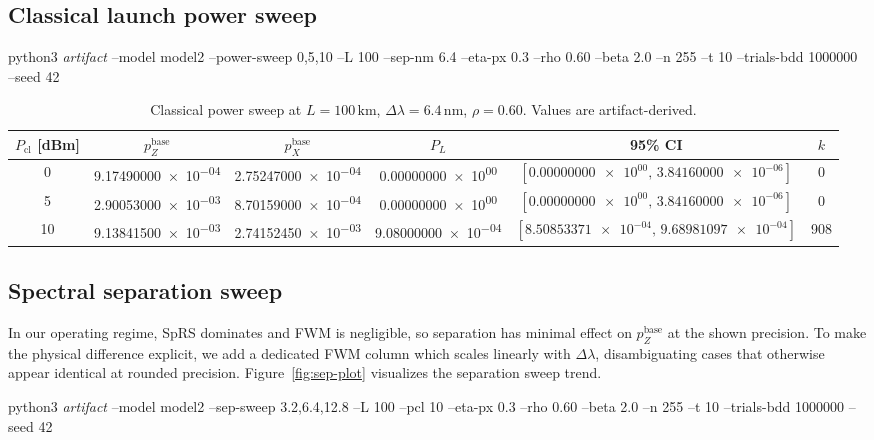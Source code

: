 \documentclass{article}
\newcommand{\cmd}[1]{\par\noindent\begingroup\scriptsize\ttfamily\raggedright\sloppy #1\par\endgroup}
\newcommand{\simL}{100}
\newcommand{\simpcl}{10}
\newcommand{\simsep}{6.4}
\newcommand{\simeta}{0.3}
\newcommand{\simn}{255}
\newcommand{\simt}{10}
\newcommand{\simtrials}{1000000}
\newcommand{\simseed}{42}
\newcommand{\simpz}{9.13841500e-03}
\newcommand{\simpx}{2.74152450e-03}
\newcommand{\simrhoB}{0.60}
\newcommand{\simpLB}{9.08000000e-04}
\newcommand{\simpLBlo}{8.50853371e-04}
\newcommand{\simpLBhi}{9.68981097e-04}
\newcommand{\simkB}{908}
\newcommand{\simpclA}{0}
\newcommand{\simpzPclA}{9.17490000e-04}
\newcommand{\simpxPclA}{2.75247000e-04}
\newcommand{\simpLPclA}{0.00000000e+00}
\newcommand{\simpLPclAlo}{0.00000000e+00}
\newcommand{\simpLPclAhi}{3.84160000e-06}
\newcommand{\simkPclA}{0}
\newcommand{\simpclB}{5}
\newcommand{\simpzPclB}{2.90053000e-03}
\newcommand{\simpxPclB}{8.70159000e-04}
\newcommand{\simpLPclB}{0.00000000e+00}
\newcommand{\simpLPclBlo}{0.00000000e+00}
\newcommand{\simpLPclBhi}{3.84160000e-06}
\newcommand{\simkPclB}{0}
\newcommand{\simpclC}{10}
\newcommand{\simsepA}{3.2}
\newcommand{\simsepB}{12.8}
\begin{document}
\subsection{Classical launch power sweep}
\cmd{python3 \emph{artifact} --model model2 --power-sweep \simpclA{},\simpclB{},\simpclC{} --L \simL{} --sep-nm \simsep{} --eta-px \simeta{} --rho \simrhoB{} --beta 2.0 --n \simn{} --t \simt{} --trials-bdd \simtrials{} --seed \simseed}

\begin{table}[ht]
\small
\centering
\caption{Classical power sweep at \(L=\simL\,\mathrm{km}\), \(\Delta\lambda=\simsep\,\mathrm{nm}\), \(\rho=\simrhoB\). Values are artifact-derived.}
\label{tab:power}
\begin{adjustbox}{width=\linewidth}
\begin{tabular}{cccccc}
\toprule
\(P_{\mathrm{cl}}\) [dBm] & \(p_Z^{\text{base}}\) & \(p_X^{\text{base}}\) & \(P_L\) & 95\% CI & \(k\) \\
\midrule
\simpclA & \num{\simpzPclA} & \num{\simpxPclA} & \num{\simpLPclA} & \([\num{\simpLPclAlo},\,\num{\simpLPclAhi}]\) & \simkPclA \\
\simpclB & \num{\simpzPclB} & \num{\simpxPclB} & \num{\simpLPclB} & \([\num{\simpLPclBlo},\,\num{\simpLPclBhi}]\) & \simkPclB \\
\simpclC & \num{\simpz} & \num{\simpx} & \num{\simpLB} & \([\num{\simpLBlo},\,\num{\simpLBhi}]\) & \simkB \\
\bottomrule
\end{tabular}
\end{adjustbox}

\end{table}

\subsection{Spectral separation sweep}
In our operating regime, SpRS dominates and FWM is negligible, so separation has minimal effect on \(p_Z^{\text{base}}\) at the shown precision. To make the physical difference explicit, we add a dedicated FWM column which scales linearly with \(\Delta\lambda\), disambiguating cases that otherwise appear identical at rounded precision. Figure~\ref{fig:sep-plot} visualizes the separation sweep trend.

\cmd{python3 \emph{artifact} --model model2 --sep-sweep \simsepA{},\simsep{},\simsepB{} --L \simL{} --pcl \simpcl{} --eta-px \simeta{} --rho \simrhoB{} --beta 2.0 --n \simn{} --t \simt{} --trials-bdd \simtrials{} --seed \simseed}
\end{document}
